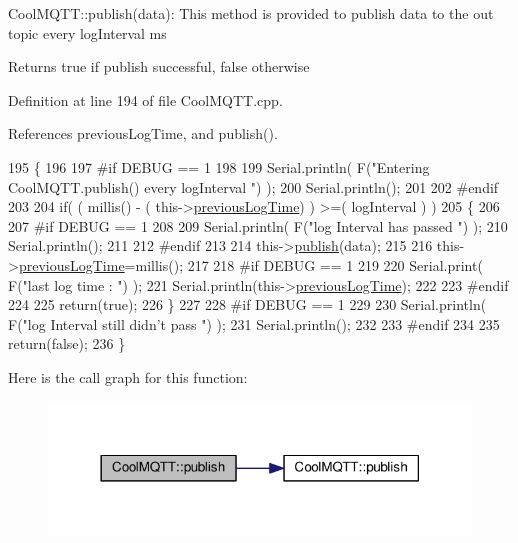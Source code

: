 Cool\+M\+Q\+T\+T\+::publish(data)\+: This method is provided to publish data to the out topic every log\+Interval ms

\begin{DoxyReturn}{Returns}
true if publish successful, false otherwise 
\end{DoxyReturn}


Definition at line 194 of file Cool\+M\+Q\+T\+T.\+cpp.



References previous\+Log\+Time, and publish().


\begin{DoxyCode}
195 \{
196 
197 \textcolor{preprocessor}{#if DEBUG == 1 }
198 
199     Serial.println( F(\textcolor{stringliteral}{"Entering CoolMQTT.publish() every logInterval "}) );
200     Serial.println();
201 
202 \textcolor{preprocessor}{#endif }
203     
204     \textcolor{keywordflow}{if}( ( millis() - ( this->\hyperlink{classCoolMQTT_a3db37ef9ed3b05b2a8d44edba0e7d3cc}{previousLogTime})  ) >=( logInterval ) )
205     \{
206     
207 \textcolor{preprocessor}{    #if DEBUG == 1}
208 
209         Serial.println( F(\textcolor{stringliteral}{"log Interval has passed "}) );
210         Serial.println();
211     
212 \textcolor{preprocessor}{    #endif}
213 
214         this->\hyperlink{classCoolMQTT_ace977b3e90ab14b1199fe5c4fb0a13ec}{publish}(data);
215 
216         this->\hyperlink{classCoolMQTT_a3db37ef9ed3b05b2a8d44edba0e7d3cc}{previousLogTime}=millis();
217     
218 \textcolor{preprocessor}{    #if DEBUG == 1 }
219 
220         Serial.print( F(\textcolor{stringliteral}{"last log time : "}) );
221         Serial.println(this->\hyperlink{classCoolMQTT_a3db37ef9ed3b05b2a8d44edba0e7d3cc}{previousLogTime});
222 
223 \textcolor{preprocessor}{    #endif}
224 
225         \textcolor{keywordflow}{return}(\textcolor{keyword}{true});
226     \}
227 
228 \textcolor{preprocessor}{#if DEBUG == 1 }
229 
230     Serial.println( F(\textcolor{stringliteral}{"log Interval still didn't pass "}) ); 
231     Serial.println();
232 
233 \textcolor{preprocessor}{#endif}
234 
235     \textcolor{keywordflow}{return}(\textcolor{keyword}{false});
236 \}
\end{DoxyCode}
Here is the call graph for this function\+:
\nopagebreak
\begin{figure}[H]
\begin{center}
\leavevmode
\includegraphics[width=318pt]{classCoolMQTT_a613c5e3927ae85bb94fbf648d84d8780_cgraph}
\end{center}
\end{figure}
\mbox{\label{classCoolMQTT_ae3c18f6ae9723746d32765f1c8f176ca}} 
